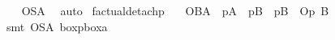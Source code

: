 \begin{isabellebody}
%
\isadelimproof
\ \ %
\endisadelimproof
%
\isatagproof
{}\isamarkupfalse%
\ O{\isacharunderscore}SA\ \isamarkupfalse%
\ auto%
\endisatagproof
{\isafoldproof}%
%
\isadelimproof
\isanewline
%
\endisadelimproof
{}\isamarkupfalse%
\ factual{\isacharunderscore}detach{\isacharunderscore}p{\isacharcolon}\isanewline
\ \ \ {\isachardoublequoteopen}{\isasymTurnstile}{\isacharparenleft}{\isacharparenleft}{\isacharparenleft}O{\isacharbraceleft}B{\isacharbar}A{\isacharbraceright}\ \isactrlbold {\isasymand}\ {\isacharparenleft}{\isasymbox}\isactrlsub pA{\isacharparenright}{\isacharparenright}\ \isactrlbold {\isasymand}\ {\isacharparenleft}{\isacharparenleft}{\isasymdiamond}\isactrlsub pB{\isacharparenright}\ \isactrlbold {\isasymand}\ {\isacharparenleft}{\isasymdiamond}\isactrlsub p{\isacharparenleft}\isactrlbold {\isasymnot}B{\isacharparenright}{\isacharparenright}{\isacharparenright}{\isacharparenright}\ \isactrlbold {\isasymrightarrow}\ {\isacharparenleft}O\isactrlsub p\ B{\isacharparenright}{\isacharparenright}{\isachardoublequoteclose}\isanewline
%
\isadelimproof
\ \ %
\endisadelimproof
%
\isatagproof
{}\isamarkupfalse%
\ {\isacharparenleft}smt\ O{\isacharunderscore}SA\ boxp{\isacharunderscore}boxa{\isacharparenright}%
\endisatagproof
{\isafoldproof}%
%
\isadelimproof
\isanewline
%
\endisadelimproof
%
\isadelimtheory
\isanewline
%
\endisadelimtheory
%
\isatagtheory
{}\isamarkupfalse%
%
\endisatagtheory
{\isafoldtheory}%
%
\isadelimtheory
%
\endisadelimtheory
%
\end{isabellebody}%
\endinput

